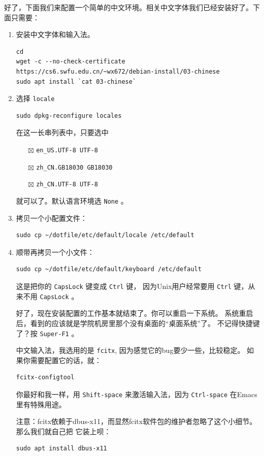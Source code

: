 \documentclass{wx672ctexart} \usepackage{hyperref}
\begin{document}
好了，下面我们来配置一个简单的中文环境。相关中文字体我们已经安装好了。下面只需要：
\begin{enumerate}
\item 安装中文字体和输入法。
\begin{verbatim}
cd
wget -c --no-check-certificate https://cs6.swfu.edu.cn/~wx672/debian-install/03-chinese
sudo apt install `cat 03-chinese`
\end{verbatim}

\item 选择 \texttt{locale}
\begin{verbatim}
sudo dpkg-reconfigure locales
\end{verbatim}
在这一长串列表中，只要选中
\begin{itemize}
\item[{$\boxtimes$}] \texttt{en\_US.UTF-8 UTF-8}
\item[{$\boxtimes$}] \texttt{zh\_CN.GB18030 GB18030}
\item[{$\boxtimes$}] \texttt{zh\_CN.UTF-8 UTF-8}
\end{itemize}
就可以了。默认语言环境选 \texttt{None} 。

\item 拷贝一个小配置文件：
\begin{verbatim}
sudo cp ~/dotfile/etc/default/locale /etc/default
\end{verbatim}

\item 顺带再拷贝一个小文件：
\begin{verbatim}
sudo cp ~/dotfile/etc/default/keyboard /etc/default
\end{verbatim}
这是把你的 \texttt{CapsLock} 键变成 \texttt{Ctrl} 键，
因为Unix用户经常要用 \texttt{Ctrl} 键，从来不用 \texttt{CapsLock} 。

好了，现在安装配置的工作基本就结束了。你可以重启一下系统。
系统重启后，看到的应该就是学院机房里那个没有桌面的“桌面系统”了。
不记得快捷键了？按 \texttt{Super-F1} 。

中文输入法，我选用的是 \texttt{fcitx}, 因为感觉它的bug要少一些，比较稳定。
如果你需要配置它的话，就：
\begin{verbatim}
fcitx-configtool
\end{verbatim}
你最好和我一样，用 \texttt{Shift-space} 来激活输入法，因为 \texttt{Ctrl-space} 在Emacs里有特殊用途。

注意：fcitx依赖于dbus-x11，而显然fcitx软件包的维护者忽略了这个小细节。那么我们就自己把
它装上呗：
\begin{verbatim}
sudo apt install dbus-x11
\end{verbatim}
\end{enumerate}
\end{document}
